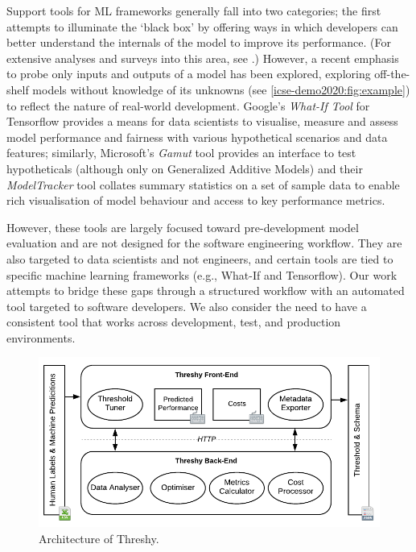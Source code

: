 Support tools for ML frameworks generally fall into two categories; the first attempts to illuminate the `black box' by offering ways in which developers can better understand the internals of the model to improve its performance. (For extensive analyses and surveys into this area, see \citep{Hohman2018VisualAI,Patel:2008:ISM:1357054.1357160}.) However, a recent emphasis to probe only inputs and outputs of a model has been explored, exploring off-the-shelf models without  knowledge of its unknowns (see \cref{icse-demo2020:fig:example}) to reflect the nature of real-world development. Google's \textit{What-If Tool} \citep{DBLP:journals/corr/abs-1907-04135} for Tensorflow provides a means for data scientists to visualise, measure and assess model performance and fairness with various hypothetical scenarios and data features; similarly, Microsoft's \textit{Gamut} tool  \citep{hohman2019gamut} provides an interface to test hypotheticals (although only on Generalized Additive Models) and their  \textit{ModelTracker} tool \citep{amershi2015modeltracker} collates summary statistics on a set of sample data to enable rich visualisation of model behaviour and access to key performance metrics.

However, these tools are largely focused toward pre-development model evaluation and are not designed for the software engineering workflow. They are also targeted to data scientists and not engineers, and certain tools are tied to specific machine learning frameworks (e.g., What-If and Tensorflow). Our work attempts to bridge these gaps through a structured workflow with an automated tool targeted to software developers. We also consider the need to have a consistent tool that works across development, test, and production environments.  

\begin{figure}[t!]
    \centering
    \includegraphics[width=\linewidth]{architecture}
    \caption[Architecture of Threshy]{Architecture of Threshy.}
    \label{icse-demo2020:fig:implementation}
    \vspace{-2em}
\end{figure}

